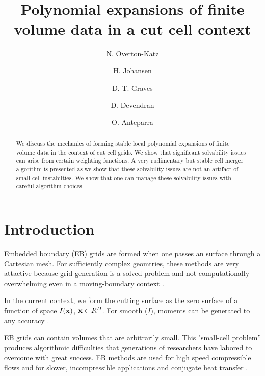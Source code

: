 \documentclass{article}
\newcommand{\xbold}{{\bf x}}
\begin{document}
\title{Polynomial expansions of finite volume data in a cut cell context}
\author{N. Overton-Katz \footnotemark[1]
   \and H. Johansen     \footnotemark[1]
   \and D. T. Graves    \footnotemark[1]
   \and D. Devendran    \footnotemark[2]
   \and O. Anteparra    \footnotemark[1]}

\maketitle

\begin{abstract}

  We discuss the mechanics of forming stable local polynomial
  expansions of finite volume data in the context of cut cell grids.
  We show that significant solvability issues can arise from certain weighting
  functions.    A very rudimentary but stable cell merger algorithm is
  presented as we show that these solvability issues are not 
  an artifact of small-cell instabilties.    We show that one can
  manage these solvability issues with careful algorithm choices.
  
\end{abstract}


\section{Introduction}

Embedded boundary (EB) grids are formed when one passes an  surface
through a Cartesian mesh.    For sufficiently complex geomtries, these methods
are very attactive because grid generation is a solved problem
and not computationally overwhelming even in a moving-boundary context
\cite{MillerTrebotich2012}.

In the current context, we form the cutting surface as the zero
surface of a function  of space $I(\xbold)$, $\xbold \in R^D$.
For smooth ($I$),  moments can be generated to any
accuracy \cite{Schwartz2015}.

EB grids can contain volumes that are arbitrarily small.    This
"small-cell problem'' produces
algorithmic difficulties that generations of researchers have labored
to overcome with great success.   EB methods are used for high speed
compressible flows \cite{Colella2006, Graves2013} and for
slower, incompressible applications \cite{Trebotich2015} and conjugate
heat transfer \cite{Crockett2010}.
\end{document}
